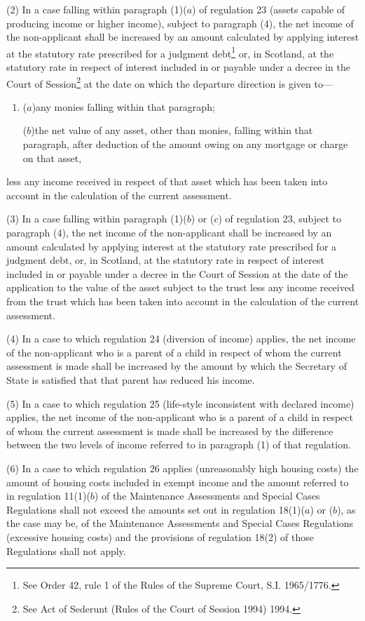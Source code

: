 \documentclass[a4paper]{article}
\begin{document}
(2) In a case falling within paragraph (1)($a$) of regulation 23 (assets capable
of producing income or higher income), subject to paragraph (4), the net income
of the non-applicant shall be increased by an amount calculated by applying
interest at the statutory rate prescribed for a judgment debt\footnote{\frenchspacing See Order 42, rule 1 of the Rules of the Supreme Court, S.I. 1965/1776.} or, in
Scotland, at the statutory rate in respect of interest included in or payable
under a decree in the Court of Session\footnote{\frenchspacing See Act of Sederunt (Rules of the Court of Session 1994) 1994.} at the date on which the departure
direction is given to—
\begin{enumerate}\item[]
($a$)any monies falling within that paragraph;

($b$)the net value of any asset, other than monies, falling within that paragraph,
after deduction of the amount owing on any mortgage or charge on that asset,
\end{enumerate}
less any income received in respect of that asset which has been taken into
account in the calculation of the current assessment.

(3) In a case falling within paragraph (1)($b$) or ($c$) of regulation 23, subject
to paragraph (4), the net income of the non-applicant shall be increased by an
amount calculated by applying interest at the statutory rate prescribed for a
judgment debt, or, in Scotland, at the statutory rate in respect of interest
included in or payable under a decree in the Court of Session at the date of the
application to the value of the asset subject to the trust less any income
received from the trust which has been taken into account in the calculation of
the current assessment.

(4) In a case to which regulation 24 (diversion of income) applies, the net
income of the non-applicant who is a parent of a child in respect of whom the
current assessment is made shall be increased by the amount by which the
Secretary of State is satisfied that that parent has reduced his income.

(5) In a case to which regulation 25 (life-style inconsistent with declared
income) applies, the net income of the non-applicant who is a parent of a child
in respect of whom the current assessment is made shall be increased by the
difference between the two levels of income referred to in paragraph (1) of that
regulation.

(6) In a case to which regulation 26 applies (unreasonably high housing costs)
the amount of housing costs included in exempt income and the amount referred to
in regulation 11(1)($b$) of the Maintenance Assessments and Special Cases
Regulations shall not exceed the amounts set out in regulation 18(1)($a$) or ($b$),
as the case may be, of the Maintenance Assessments and Special Cases Regulations
(excessive housing costs) and the provisions of regulation 18(2) of those
Regulations shall not apply.
\end{document}
